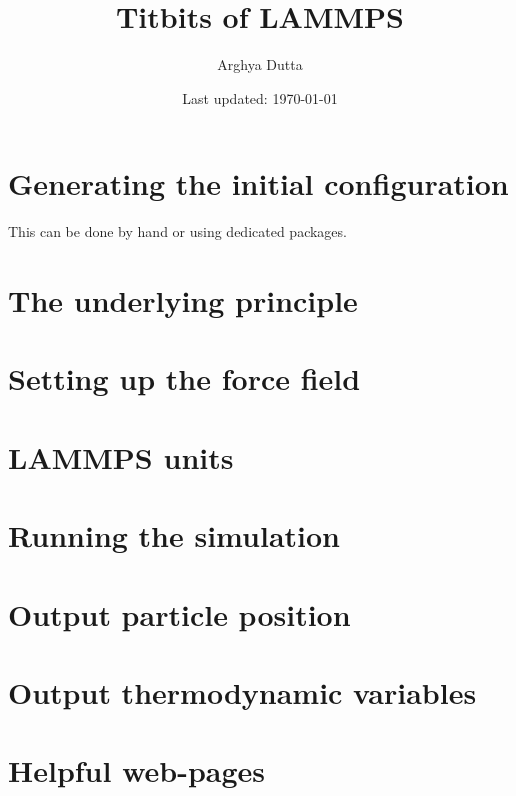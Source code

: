 \documentclass[10pt,a4paper]{article}
\title{Titbits of LAMMPS}
\author{Arghya Dutta}
\date{Last updated: \today}
\begin{document}
\maketitle
\section{Generating the initial configuration}
This can be done by hand or using dedicated packages.
\section{The underlying principle}
\section{Setting up the force field}
\section{LAMMPS units}	
\section{Running the simulation}
\section{Output particle position}
\section{Output thermodynamic variables}
\section{Helpful web-pages}
\end{document}
